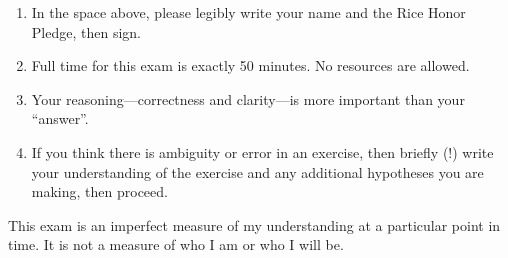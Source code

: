 \begin{enumerate}
\item In the space above, please legibly write your name and the Rice Honor Pledge, then sign.
\item Full time for this exam is exactly 50 minutes. No resources are allowed.
\item Your reasoning---correctness and clarity---is more important than your ``answer''.
\item If you think there is ambiguity or error in an exercise, then briefly (!) write your understanding of the exercise and any additional hypotheses you are making, then proceed.
\end{enumerate}
This exam is an imperfect measure of my understanding at a particular point in time. It is not a measure of who I am or who I will be.